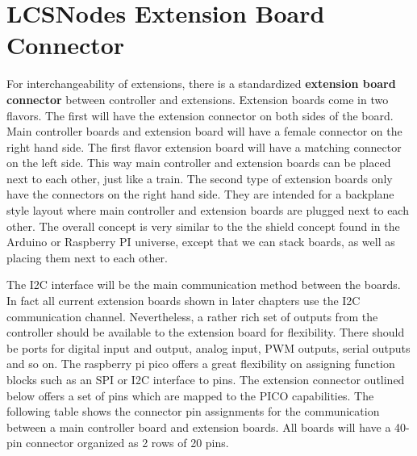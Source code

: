 \section{LCSNodes Extension Board Connector}

For interchangeability of extensions, there is a standardized \textbf{extension board connector} between controller and extensions. Extension boards come in two flavors. The first will have the extension connector on both sides of the board. Main controller boards and extension board will have a female connector on the right hand side. The first flavor extension board will have a matching connector on the left side. This way main controller and extension boards can be placed next to each other, just like a train. The second type of extension boards only have the connectors on the right hand side. They are intended for a backplane style layout where main controller and extension boards are plugged next to each other. The overall concept is very similar to the the shield concept found in the Arduino or Raspberry PI universe, except that we can stack boards, as well as placing them next to each other. 

The I2C interface will be the main communication method between the boards. In fact all current extension boards shown in later chapters use the I2C communication channel. Nevertheless, a rather rich set of outputs from the controller should be available to the extension board for flexibility. There should be ports for digital input and output, analog input, PWM outputs, serial outputs and so on. The raspberry pi pico offers a great flexibility on assigning function blocks such as an SPI or I2C interface to pins. The extension connector outlined below offers a set of pins which are mapped to the PICO capabilities. The following table shows the connector pin assignments for the communication between a main controller board and extension boards. All boards will have a 40-pin connector organized as 2 rows of 20 pins.

